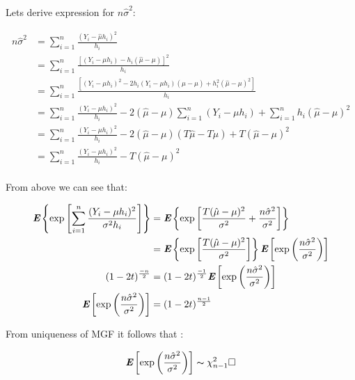 Lets derive expression for $n\hat{\sigma}^2$:

\begin{equation}
\begin{aligned}
\label{eq:ap_sigma_square_expansion_2}
n\hat{\sigma}^2 &= \sum_{i=1}^n\frac{(Y_i - \hat{\mu}h_i)^2}{h_i} \\
								&= \sum_{i=1}^n\frac{\left[(Y_i - \mu h_i) - h_i(\hat{\mu} - \mu )\right]^2}{h_i} \\
								&= \sum_{i=1}^n\frac{\left[(Y_i - \mu h_i)^2 -2h_i(Y_i - \mu h_i)(\hat{\mu} - \mu) + h_i^2(\hat{\mu} - \mu)^2\right]}{h_i} \\
								&= \sum_{i=1}^n\frac{(Y_i - \mu h_i)^2}{h_i} -2(\hat{\mu} - \mu)\sum_{i=1}^n(Y_i - \mu h_i) + \sum_{i=1}^nh_i(\hat{\mu} - \mu)^2 \\
								&= \sum_{i=1}^n\frac{(Y_i - \mu h_i)^2}{h_i} -2(\hat{\mu} - \mu)\left(T\hat{\mu} - T\mu\right) + T(\hat{\mu} - \mu)^2 \\
								&= \sum_{i=1}^n\frac{(Y_i - \mu h_i)^2}{h_i} -T(\hat{\mu} - \mu)^2 \\
\end{aligned}
\end{equation}

From above we can see that:

\begin{equation}
\begin{aligned}
\textbf{\em E}\left\{\exp\left[\sum_{i=1}^n\frac{(Y_i - \mu h_i)^2}{\sigma^2h_i}\right]\right\} 
							&= \textbf{\em E}\left\{\exp\left[\frac{T(\hat{\mu} - \mu)^2}{\sigma^2} + \frac{n\hat{\sigma}^2}{\sigma^2}\right]\right\} \\
							&= \textbf{\em E}\left\{\exp\left[\frac{T(\hat{\mu} - \mu)^2}{\sigma^2}\right]\right\}\textbf{\em E}\left[\exp\left(\frac{n\hat{\sigma}^2}{\sigma^2}\right)\right] \\
(1-2t)^\frac{-n}{2} 
							&= (1-2t)^\frac{-1}{2}\textbf{\em E}\left[\exp\left(\frac{n\hat{\sigma}^2}{\sigma^2}\right)\right]  \\
\textbf{\em E}\left[\exp\left(\frac{n\hat{\sigma}^2}{\sigma^2}\right)\right]  
							&= (1-2t)^\frac{n-1}{2}							
\end{aligned}
\end{equation}

From uniqueness of MGF it follows that :

\begin{equation}
\textbf{\em E}\left[\exp\left(\frac{n\hat{\sigma}^2}{\sigma^2}\right)\right]  
							\thicksim \chi^2_{n-1} \square							
\end{equation}
